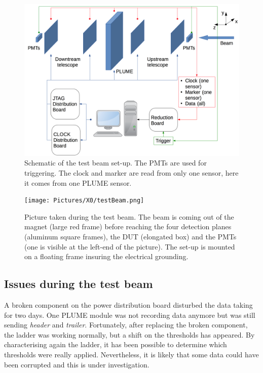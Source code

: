     \begin{figure}[!h]
      \centering
      \includegraphics[width = \textwidth]{Pictures/X0/testBeamAcquisition.png}
      \caption{Schematic of the test beam set-up. The PMTs are used for triggering. The clock and marker are read from only one sensor, here it comes from one PLUME sensor.}
      \label{fig:testBeamAcq}
    \end{figure}

    \begin{figure}
      \centering
      \texttt{[image: Pictures/X0/testBeam.png]}
      \caption{Picture taken during the test beam. The beam is coming out of the magnet (large red frame) before reaching the four detection planes (aluminum square frames), the DUT (elongated box) and the PMTs (one is visible at the left-end of the picture). The set-up is mounted on a floating frame insuring the electrical grounding.}
      \label{fig:testBeam}
    \end{figure}

    \subsection{Issues during the test beam}

    A broken component on the power distribution board disturbed the data taking for two days.
    One \gls{PLUME} module was not recording data anymore but was still sending \textit{header} and \textit{trailer}.
    Fortunately, after replacing the broken component, the ladder was working normally, but a shift on the thresholds has appeared.
    By characterising again the ladder, it has been possible to determine which thresholds were really applied. 
    Nevertheless, it is likely that some data could have been corrupted and this is under investigation.
   
